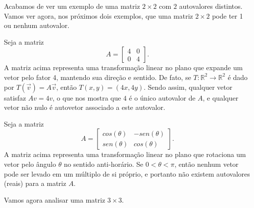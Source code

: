 Acabamos de ver um exemplo de uma matriz $2 \times 2$ com $2$ autovalores distintos. Vamos ver agora, nos próximos dois exemplos, que uma matriz $2\times 2$ pode ter 1 ou nenhum autovalor.

\begin{ex}
	Seja  a matriz
	\begin{equation}
	A={
	\begin{bmatrix}
	4 & 0 \\
	0 & 4
	\end{bmatrix}}.
	\end{equation}
	A matriz acima representa uma transformação linear no plano que expande um vetor pelo fator 4, mantendo sua direção e sentido. De fato, se $T:\mathbb{R}^2 \rightarrow \mathbb{R}^2$ é dado por $T(\vec{v})=A \vec{v}$, então $T(x,y)=(4x,4y)$.
    Sendo assim, qualquer vetor satisfaz $Av = 4v$, o que nos mostra que $4$ é o único autovalor de $A$, e qualquer vetor não nulo é autovetor associado a este autovalor.
\end{ex}


\begin{ex}
	Seja  a matriz
	\begin{equation}
	A={
	\begin{bmatrix}
	cos(\theta) & -sen(\theta) \\
	sen(\theta) & cos(\theta)
	\end{bmatrix}}.
	\end{equation}
	A matriz acima representa uma transformação linear no plano que rotaciona um vetor pelo ângulo $\theta$ no sentido anti-horário.
	Se $0<\theta<\pi$, então nenhum vetor pode ser levado em um múltiplo de si próprio, e portanto não existem autovalores (reais) para a matriz $A$. 
\end{ex}

Vamos agora analisar uma matriz $3\times 3$.

